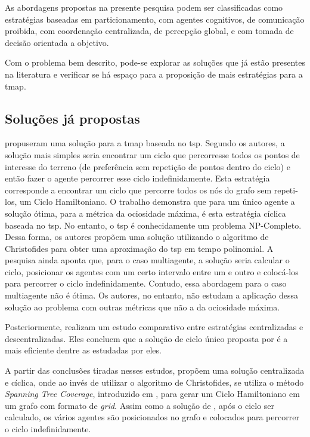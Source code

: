 As abordagens propostas na presente pesquisa podem ser classificadas como 
estratégias baseadas em particionamento, com agentes 
cognitivos, de comunicação proibida, com coordenação 
centralizada, de percepção global, e com tomada de decisão 
orientada a objetivo.

Com o problema bem descrito, pode-se explorar as soluções que já estão presentes 
na literatura e verificar se há espaço para a proposição de mais estratégias 
para a \ac{tmap}.

\subsection{Soluções já propostas}

\citep{Chevaleyre:2004:TAM:1018411.1019013} propuseram uma solução para a 
\ac{tmap} baseada no \ac{tsp}. Segundo os autores, a solução mais simples seria 
encontrar um ciclo que percorresse todos os pontos de interesse do terreno 
(de preferência sem repetição de pontos dentro do ciclo) e então fazer o agente 
percorrer esse ciclo indefinidamente. Esta estratégia corresponde a encontrar um 
ciclo que percorre todos os nós do grafo sem repeti-los, um Ciclo Hamiltoniano. 
O trabalho demonstra que para um único agente a solução ótima, para a métrica da 
ociosidade máxima, é esta estratégia cíclica baseada no \ac{tsp}. No entanto, 
o \ac{tsp} é conhecidamente um problema NP-Completo. Dessa forma, os autores 
propõem uma solução utilizando o algoritmo de Christofides 
\citep{christofides1976worst} para obter uma aproximação do \ac{tsp} em tempo 
polinomial. A pesquisa ainda aponta que, para o caso multiagente, a solução 
seria calcular o ciclo, posicionar os agentes com um certo intervalo entre um e 
outro e colocá-los para percorrer o ciclo indefinidamente. Contudo, essa 
abordagem para o caso multiagente não é ótima. Os autores, no entanto, não 
estudam a aplicação dessa solução ao problema com outras métricas que não a da 
ociosidade máxima.

Posteriormente, \citep{Almeida:2004:AAI} realizam um estudo comparativo entre 
estratégias centralizadas e descentralizadas. Eles concluem que a solução de 
ciclo único proposta por \citep{Chevaleyre:2004:TAM:1018411.1019013} é a mais 
eficiente dentre as estudadas por eles.

A partir das conclusões tiradas nesses estudos, \citep{4209122} propõem uma 
solução centralizada e cíclica, onde ao invés de utilizar o algoritmo de 
Christofides, se utiliza o método \textit{Spanning Tree Coverage}, introduzido 
em \citep{Gabriely:2001}, para gerar um Ciclo Hamiltoniano em um grafo com 
formato de \textit{grid}. Assim como a solução de 
\citep{Chevaleyre:2004:TAM:1018411.1019013}, após o ciclo ser calculado, os 
vários agentes são posicionados no grafo e colocados para percorrer o ciclo 
indefinidamente.

